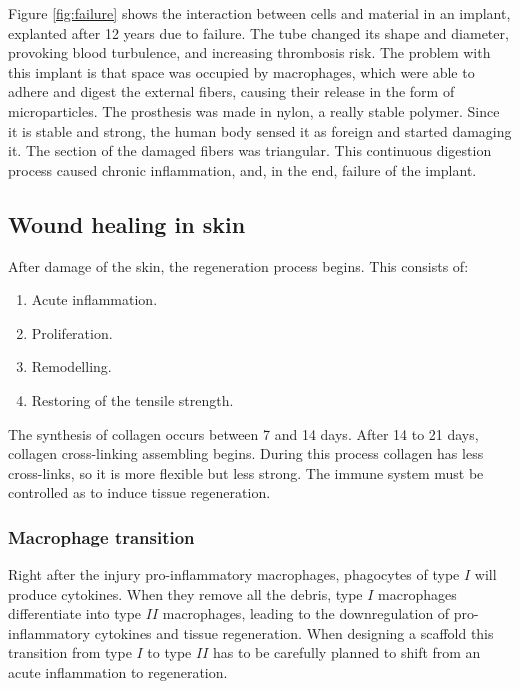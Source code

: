		Figure \ref{fig:failure} shows the interaction between cells and material in an implant, explanted after 12 years due to failure.
		The tube changed its shape and diameter, provoking blood turbulence, and increasing thrombosis risk.
		The problem with this implant is that space was occupied by macrophages, which were able to adhere and digest the external fibers, causing their release in the form of microparticles.
		The prosthesis was made in nylon, a really stable polymer.
		Since it is stable and strong, the human body sensed it as foreign and started damaging it.
		The section of the damaged fibers was triangular.
		This continuous digestion process caused chronic inflammation, and, in the end, failure of the implant.

	\subsection{Wound healing in skin}
	After damage of the skin, the regeneration process begins.
	This consists of:

	\begin{multicols}{2}
		\begin{enumerate}
			\item Acute inflammation.
			\item Proliferation.
			\item Remodelling.
			\item Restoring of the tensile strength.
		\end{enumerate}
	\end{multicols}

	The synthesis of collagen occurs between 7 and 14 days.
	After 14 to 21 days, collagen cross-linking assembling begins.
	During this process collagen has less cross-links, so it is more flexible but less strong.
	The immune system must be controlled as to induce tissue regeneration.

		\subsubsection{Macrophage transition}
		Right after the injury pro-inflammatory macrophages, phagocytes of type $I$ will produce cytokines.
		When they remove all the debris, type $I$ macrophages differentiate into type $II$ macrophages, leading to the downregulation of pro-inflammatory cytokines and tissue regeneration.
		When designing a scaffold this transition from type $I$ to type $II$ has to be carefully planned to shift from an acute inflammation to regeneration.

